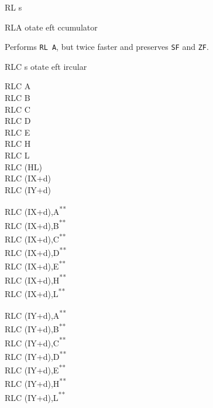 \documentclass[12pt,twoside,openright,a4paper]{book}
\newcommand{\UNDOC}{\textnormal{\textsuperscript{**}}}
\begin{document}
\begin{basedescript}{
	\desclabelstyle{\multilinelabel}
	\desclabelwidth{3cm}}
\begin{DetailItem}{RL s}
	\end{DetailItem}

	\pagebreak
	\begin{DetailItem}{RLA}
		{otate eft ccumulator}
		{}

		Performs {\tt RL A}, but twice faster and preserves {\tt SF} and {\tt ZF}.

		\begin{DetailEffects}
			\FlagsRLA
		\end{DetailEffects}
						
		\begin{DetailTiming}
		\end{DetailTiming}

	\end{DetailItem}
	
	\begin{DetailItem}{RLC s}
		{otate eft ircular}
		{}

		\begin{DetailVariants}
			RLC A\\
			RLC B\\
			RLC C\\
			RLC D\\
			RLC E\\
			RLC H\\
			RLC L\\
			RLC (HL)\\
			RLC (IX+d)\\
			RLC (IY+d)

			\columnbreak
			RLC (IX+d),A\UNDOC\\
			RLC (IX+d),B\UNDOC\\
			RLC (IX+d),C\UNDOC\\
			RLC (IX+d),D\UNDOC\\
			RLC (IX+d),E\UNDOC\\
			RLC (IX+d),H\UNDOC\\
			RLC (IX+d),L\UNDOC

			\columnbreak
			RLC (IY+d),A\UNDOC\\
			RLC (IY+d),B\UNDOC\\
			RLC (IY+d),C\UNDOC\\
			RLC (IY+d),D\UNDOC\\
			RLC (IY+d),E\UNDOC\\
			RLC (IY+d),H\UNDOC\\
			RLC (IY+d),L\UNDOC
		\end{DetailVariants}


\end{DetailItem}
\end{basedescript}
\end{document}
